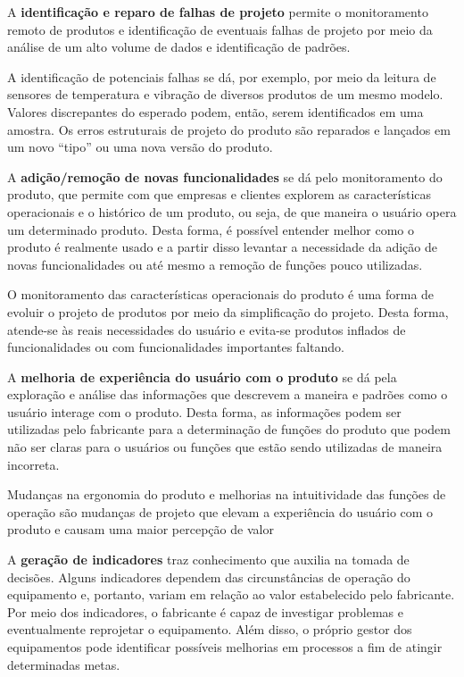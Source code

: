 	A \textbf{identificação e reparo de falhas de projeto} permite o monitoramento remoto de produtos e identificação de eventuais falhas de projeto por meio da análise de um alto volume de dados e identificação de padrões.
	
	A  identificação de potenciais falhas se dá, por exemplo, por meio da leitura de sensores de temperatura e vibração de diversos produtos de um mesmo modelo. Valores discrepantes do esperado podem, então, serem identificados em uma amostra. Os erros estruturais de projeto do produto são reparados e lançados em um novo ``tipo'' ou uma nova versão do produto.
	
	A \textbf{adição/remoção de novas funcionalidades} se dá pelo monitoramento do produto, que permite com que empresas e clientes explorem  as características operacionais e o histórico de um produto, ou seja, de que maneira o usuário opera um determinado produto. Desta forma, é possível entender melhor como o produto é realmente usado e a partir disso levantar a necessidade da adição de novas funcionalidades ou até mesmo a remoção de funções pouco utilizadas.
	
	O monitoramento das características operacionais do produto é uma forma de evoluir o projeto de produtos por meio da simplificação do projeto. Desta forma, atende-se às reais necessidades do usuário e evita-se produtos inflados de funcionalidades ou com funcionalidades importantes faltando.
	
	A \textbf{melhoria de experiência do usuário com o produto} se dá pela exploração e análise das informações que descrevem a maneira e padrões como o usuário interage com o produto. Desta forma, as informações podem ser utilizadas pelo fabricante para a determinação de funções do produto que podem não ser claras para o usuários ou funções que estão sendo utilizadas de maneira incorreta.
	
	Mudanças na ergonomia do produto e melhorias na intuitividade das funções de operação são mudanças de projeto que elevam a experiência do usuário com o produto e causam uma maior percepção de valor
	
	A \textbf{geração de indicadores} traz conhecimento que auxilia na tomada de decisões. Alguns indicadores dependem das circunstâncias de operação do equipamento e, portanto, variam em relação ao valor estabelecido pelo fabricante. Por meio dos indicadores, o fabricante é capaz de investigar problemas e eventualmente reprojetar o equipamento. Além disso, o próprio gestor dos equipamentos pode identificar possíveis melhorias em processos a fim de atingir determinadas metas. 
	
